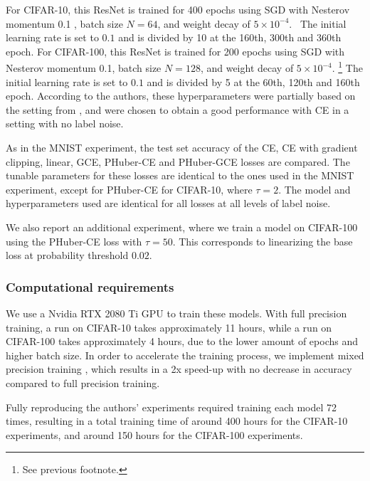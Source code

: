 For CIFAR-10, this ResNet is trained for 400 epochs using SGD with Nesterov momentum 0.1 \citep{nesterov_method_1983, sutskever_importance_2013}, batch size $N=64$, and weight decay of $5 \times 10^{-4}$. \footnotemark \ The initial learning rate is set to $0.1$ and is divided by 10 at the 160th, 300th and 360th epoch. For CIFAR-100, this ResNet is trained for 200 epochs using SGD with Nesterov momentum 0.1, batch size $N=128$, and weight decay of $5 \times 10^{-4}$. \footnote{See previous footnote.} The initial learning rate is set to $0.1$ and is divided by 5 at the 60th, 120th and 160th epoch. According to the authors, these hyperparameters were partially based on the setting from \citet{devries_improved_2017}, and were chosen to obtain a good performance with CE in a setting with no label noise.

As in the MNIST experiment, the test set accuracy of the CE, CE with gradient clipping, linear, GCE, PHuber-CE and PHuber-GCE losses are compared. The tunable parameters for these losses are identical to the ones used in the MNIST experiment, except for PHuber-CE for CIFAR-10, where $\tau = 2$. The model and hyperparameters used are identical for all losses at all levels of label noise.

We also report an additional experiment, where we train a model on CIFAR-100 using the PHuber-CE loss with $\tau = 50$. This corresponds to linearizing the base loss at probability threshold $0.02$.


\subsubsection{Computational requirements}
\label{cifar-compute-reqs}
We use a Nvidia RTX 2080 Ti GPU to train these models. With full precision training, a run on CIFAR-10 takes approximately 11 hours, while a run on CIFAR-100 takes approximately 4 hours, due to the lower amount of epochs and higher batch size. In order to accelerate the training process, we implement mixed precision training \citep{micikevicius_mixed_2017}, which results in a 2x speed-up with no decrease in accuracy compared to full precision training.

Fully reproducing the authors' experiments required training each model 72 times, resulting in a total training time of around 400 hours for the CIFAR-10 experiments, and around 150 hours for the CIFAR-100 experiments.

